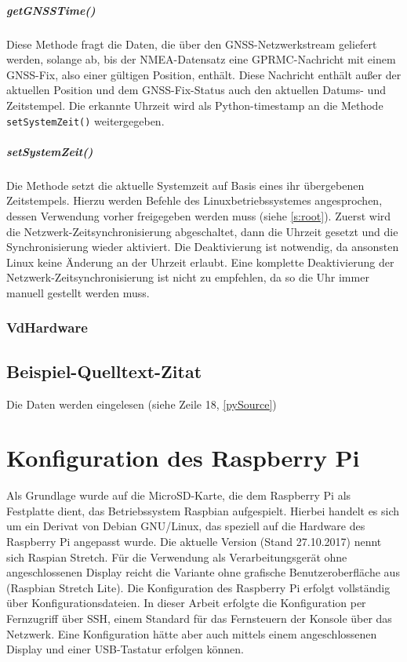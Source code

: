 \documentclass[a4paper,12pt,bibliography=totoc, listof=totoc,titlepage,pointlessnumbers]{scrreprt}
\newcommand{\code}[1]{\texttt{#1}}
\begin{document}
\paragraph{getGNSSTime()}
Diese Methode fragt die Daten, die über den GNSS-Netzwerkstream geliefert werden, solange ab, bis der NMEA-Datensatz eine GPRMC-Nachricht mit einem GNSS-Fix, also einer gültigen Position, enthält. Diese Nachricht enthält außer der aktuellen Position und dem GNSS-Fix-Status auch den aktuellen Datums- und Zeitstempel. Die erkannte Uhrzeit wird als Python-timestamp an die Methode \code{setSystemZeit()} weitergegeben.

\paragraph{setSystemZeit()}
Die Methode setzt die aktuelle Systemzeit auf Basis eines ihr übergebenen Zeitstempels. Hierzu werden Befehle des Linuxbetriebssystemes angesprochen, dessen Verwendung vorher freigegeben werden muss (siehe \autoref{s:root}). Zuerst wird die Netzwerk-Zeitsynchronisierung abgeschaltet, dann die Uhrzeit gesetzt und die Synchronisierung wieder aktiviert. Die Deaktivierung ist notwendig, da ansonsten Linux keine Änderung an der Uhrzeit erlaubt. Eine komplette Deaktivierung der Netzwerk-Zeitsynchronisierung ist nicht zu empfehlen, da so die Uhr immer manuell gestellt werden muss.

\subsection{VdHardware}




\section{Beispiel-Quelltext-Zitat}

Die Daten werden eingelesen (siehe Zeile 18, \autoref{pySource})




\chapter{Konfiguration des Raspberry Pi}
\label{c:konfig}

Als Grundlage wurde auf die MicroSD-Karte, die dem Raspberry Pi als Festplatte dient, das Betriebssystem Raspbian aufgespielt. Hierbei handelt es sich um ein Derivat von Debian GNU/Linux, das speziell auf die Hardware des Raspberry Pi angepasst wurde. Die aktuelle Version (Stand 27.10.2017) nennt sich Raspian Stretch. Für die Verwendung als Verarbeitungsgerät ohne angeschlossenen Display reicht die Variante ohne grafische Benutzeroberfläche aus (Raspbian Stretch Lite). Die Konfiguration des Raspberry Pi erfolgt vollständig über Konfigurationsdateien. In dieser Arbeit erfolgte die Konfiguration per Fernzugriff über SSH, einem Standard für das Fernsteuern der Konsole über das Netzwerk. Eine Konfiguration hätte aber auch mittels einem angeschlossenen Display und einer USB-Tastatur erfolgen können.
\end{document}
